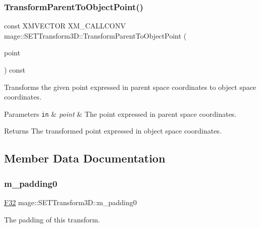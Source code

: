 \subsubsection{\texorpdfstring{Transform\+Parent\+To\+Object\+Point()}{TransformParentToObjectPoint()}}
{\footnotesize\ttfamily const X\+M\+V\+E\+C\+T\+OR X\+M\+\_\+\+C\+A\+L\+L\+C\+O\+NV mage\+::\+S\+E\+T\+Transform3\+D\+::\+Transform\+Parent\+To\+Object\+Point (\begin{DoxyParamCaption}\item[{F\+X\+M\+V\+E\+C\+T\+OR}]{point }\end{DoxyParamCaption}) const\hspace{0.3cm}{\ttfamily [noexcept]}}

Transforms the given point expressed in parent space coordinates to object space coordinates.


\begin{DoxyParams}[1]{Parameters}
\mbox{\tt in}  & {\em point} & The point expressed in parent space coordinates. \\
\hline
\end{DoxyParams}
\begin{DoxyReturn}{Returns}
The transformed point expressed in object space coordinates. 
\end{DoxyReturn}


\subsection{Member Data Documentation}
\mbox{\label{classmage_1_1_s_e_t_transform3_d_a75ca9513340d15c98afd79674637d384}} 
\subsubsection{\texorpdfstring{m\+\_\+padding0}{m\_padding0}}
{\footnotesize\ttfamily \mbox{\hyperlink{namespacemage_aa97e833b45f06d60a0a9c4fc22ae02c0}{F32}} mage\+::\+S\+E\+T\+Transform3\+D\+::m\+\_\+padding0\hspace{0.3cm}{\ttfamily [private]}}

The padding of this transform. \mbox{\label{classmage_1_1_s_e_t_transform3_d_aa5508fc722eff45b82130420ada1247f}} 

